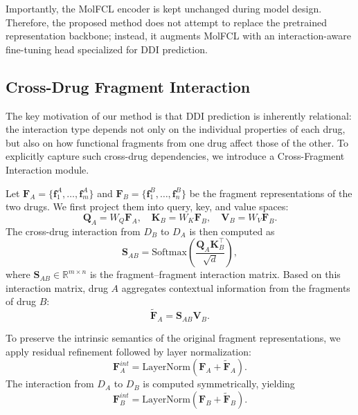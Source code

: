 Importantly, the MolFCL encoder is kept unchanged during model design. Therefore, the proposed method does not attempt to replace the pretrained representation backbone; instead, it augments MolFCL with an interaction-aware fine-tuning head specialized for DDI prediction.

\subsection{Cross-Drug Fragment Interaction}

The key motivation of our method is that DDI prediction is inherently relational: the interaction type depends not only on the individual properties of each drug, but also on how functional fragments from one drug affect those of the other. To explicitly capture such cross-drug dependencies, we introduce a Cross-Fragment Interaction module.

Let $\mathbf{F}_A = \{\mathbf{f}^{A}_{1}, \ldots, \mathbf{f}^{A}_{m}\}$ and $\mathbf{F}_B = \{\mathbf{f}^{B}_{1}, \ldots, \mathbf{f}^{B}_{n}\}$ be the fragment representations of the two drugs. We first project them into query, key, and value spaces:
\begin{equation}
\mathbf{Q}_A = W_Q \mathbf{F}_A,\quad
\mathbf{K}_B = W_K \mathbf{F}_B,\quad
\mathbf{V}_B = W_V \mathbf{F}_B.
\end{equation}
The cross-drug interaction from $D_B$ to $D_A$ is then computed as
\begin{equation}
\mathbf{S}_{AB} =
\mathrm{Softmax}\left(
\frac{\mathbf{Q}_A \mathbf{K}_B^\top}{\sqrt{d}}
\right),
\end{equation}
where $\mathbf{S}_{AB} \in \mathbb{R}^{m \times n}$ is the fragment--fragment interaction matrix. Based on this interaction matrix, drug $A$ aggregates contextual information from the fragments of drug $B$:
\begin{equation}
\widetilde{\mathbf{F}}_A = \mathbf{S}_{AB} \mathbf{V}_B.
\end{equation}

To preserve the intrinsic semantics of the original fragment representations, we apply residual refinement followed by layer normalization:
\begin{equation}
\mathbf{F}^{int}_A = \mathrm{LayerNorm}(\mathbf{F}_A + \widetilde{\mathbf{F}}_A).
\end{equation}
The interaction from $D_A$ to $D_B$ is computed symmetrically, yielding
\begin{equation}
\mathbf{F}^{int}_B = \mathrm{LayerNorm}(\mathbf{F}_B + \widetilde{\mathbf{F}}_B).
\end{equation}


